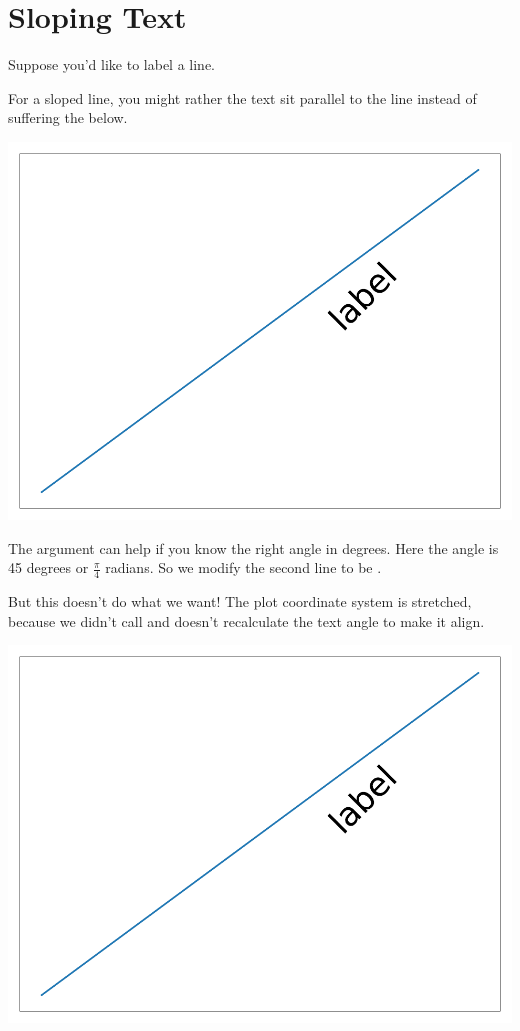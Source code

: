\section{Sloping Text}\label{sec:slopingtext}

Suppose you'd like to label a line. 

For a sloped line, you might rather the text sit parallel to the line instead of suffering the below.


\begin{center}
    \includegraphics[width = .6\textwidth]{figures/mathplots/no-slope.pdf}
\end{center}

The  argument can help if you know the right angle in degrees. Here the angle is 45 degrees or $\frac{\pi}{4}$ radians. So we modify the second line to be .

But this doesn't do what we want! The plot coordinate system is stretched, because we didn't call  and  doesn't recalculate the text angle to make it align. 

\begin{center}
    \includegraphics[width = .6\textwidth]{figures/mathplots/bad-slope.pdf}
\end{center}

